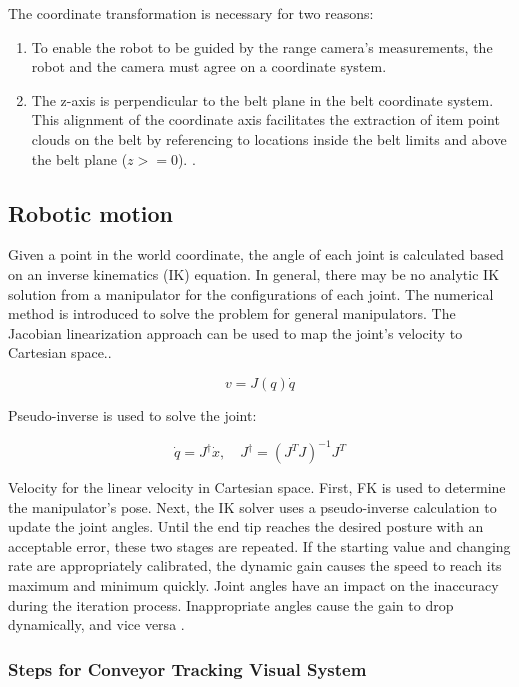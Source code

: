 \documentclass[12pt]{article}
\begin{document}
 The coordinate transformation is necessary for two reasons:\cite{ref5}
 \begin{enumerate}
     \item  To enable the robot to be guided by the range camera's measurements, the robot and the camera must agree on a coordinate system\cite{ref5}.

    \item The z-axis is perpendicular to the belt plane in the belt coordinate system.  This alignment of the coordinate axis facilitates the extraction of item point clouds on the belt by referencing to locations inside the belt limits and above the belt plane ($z >= 0$). \cite{ref5}.
 \end{enumerate}
 \subsection{Robotic motion}
Given a point in the world coordinate, the angle of each joint is calculated based on an inverse kinematics (IK) equation. In general, there may be no analytic IK solution from a manipulator for the configurations of each joint. The numerical method is introduced to solve the problem for
general manipulators. The Jacobian linearization approach can be used to map the joint's velocity to Cartesian space.\cite{ref19}.

\[
v = J(q) \dot{q} 
\]

Pseudo-inverse is used to solve the joint:\cite{ref19}


\[
\dot{q} = J^\dagger \dot{x}, \quad J^\dagger = (J^T J)^{-1} J^T
\]

Velocity for the linear velocity in Cartesian space. First, FK is used to determine the manipulator's pose. Next, the IK solver uses a pseudo-inverse calculation to update the joint angles. Until the end tip reaches the desired posture with an acceptable error, these two stages are repeated. If the starting value and changing rate are appropriately calibrated, the dynamic gain causes the speed to reach its maximum and minimum quickly. Joint angles have an impact on the inaccuracy during the iteration process. Inappropriate angles cause the gain to drop dynamically, and vice versa \cite{ref19}.

\subsubsection{Steps for Conveyor Tracking Visual System}
\end{document}
